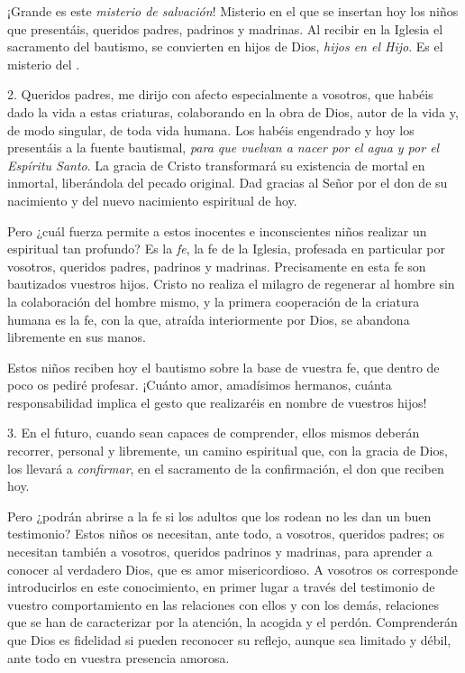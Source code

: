 {¡Grande es este \emph{misterio de salvación}! Misterio en el que se insertan hoy los niños que presentáis, queridos padres, padrinos y madrinas. Al recibir en la Iglesia el sacramento del bautismo, se convierten en hijos de Dios, \emph{hijos en el Hijo}. Es el misterio del .

2. Queridos padres, me dirijo con afecto especialmente a vosotros, que habéis dado la vida a estas criaturas, colaborando en la obra de Dios, autor de la vida y, de modo singular, de toda vida humana. Los habéis engendrado y hoy los presentáis a la fuente bautismal, \emph{para que vuelvan a nacer por el agua y por el Espíritu Santo}. La gracia de Cristo transformará su existencia de mortal en inmortal, liberándola del pecado original. Dad gracias al Señor por el don de su nacimiento y del nuevo nacimiento espiritual de hoy.

Pero ¿cuál fuerza permite a estos inocentes e inconscientes niños realizar un  espiritual tan profundo? Es la \emph{fe}, la fe de la Iglesia, profesada en particular por vosotros, queridos padres, padrinos y madrinas. Precisamente en esta fe son bautizados vuestros hijos. Cristo no realiza el milagro de regenerar al hombre sin la colaboración del hombre mismo, y la primera cooperación de la criatura humana es la fe, con la que, atraída interiormente por Dios, se abandona libremente en sus manos.

Estos niños reciben hoy el bautismo sobre la base de vuestra fe, que dentro de poco os pediré profesar. ¡Cuánto amor, amadísimos hermanos, cuánta responsabilidad implica el gesto que realizaréis en nombre de vuestros hijos!

3. En el futuro, cuando sean capaces de comprender, ellos mismos deberán recorrer, personal y libremente, un camino espiritual que, con la gracia de Dios, los llevará a \emph{confirmar}, en el sacramento de la confirmación, el don que reciben hoy.

Pero ¿podrán abrirse a la fe si los adultos que los rodean no les dan un buen testimonio? Estos niños os necesitan, ante todo, a vosotros, queridos padres; os necesitan también a vosotros, queridos padrinos y madrinas, para aprender a conocer al verdadero Dios, que es amor misericordioso. A vosotros os corresponde introducirlos en este conocimiento, en primer lugar a través del testimonio de vuestro comportamiento en las relaciones con ellos y con los demás, relaciones que se han de caracterizar por la atención, la acogida y el perdón. Comprenderán que Dios es fidelidad si pueden reconocer su reflejo, aunque sea limitado y débil, ante todo en vuestra presencia amorosa.

}
